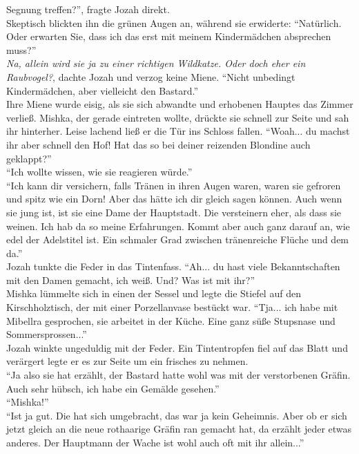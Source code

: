 Segnung treffen?'', fragte Jozah direkt.\\
Skeptisch blickten ihn die grünen Augen an, während sie erwiderte: ``Natürlich. Oder erwarten Sie, 
dass ich das erst mit meinem Kindermädchen absprechen muss?''\\
\textit{Na, allein wird sie ja zu einer richtigen Wildkatze. Oder doch eher ein Raubvogel?}, dachte 
Jozah und verzog keine Miene. ``Nicht unbedingt Kindermädchen, aber vielleicht den Bastard.''\\
Ihre Miene wurde eisig, als sie sich abwandte und erhobenen Hauptes das Zimmer verließ. Mishka, der 
gerade eintreten wollte, drückte sie schnell zur Seite und sah ihr hinterher. Leise lachend ließ er 
die Tür ins Schloss fallen. ``Woah... du machst ihr aber schnell den Hof! Hat das so bei deiner 
reizenden Blondine auch geklappt?''\\
``Ich wollte wissen, wie sie reagieren würde.''\\
``Ich kann dir versichern, falls Tränen in ihren Augen waren, waren sie gefroren und spitz wie ein 
Dorn! Aber das hätte ich dir gleich sagen können. Auch wenn sie jung ist, ist sie eine Dame der 
Hauptstadt. Die versteinern eher, als dass sie weinen. Ich hab da so meine Erfahrungen. Kommt aber 
auch ganz darauf an, wie edel der Adelstitel ist. Ein schmaler Grad zwischen tränenreiche Flüche 
und dem da.''\\
Jozah tunkte die Feder in das Tintenfass. ``Ah... du hast viele Bekanntschaften mit den 
Damen gemacht, ich weiß. Und? Was ist mit ihr?''\\
Mishka lümmelte sich in einen der Sessel und legte die Stiefel auf den Kirschholztisch, der mit 
einer Porzellanvase bestückt war. ``Tja... ich habe mit Mibellra gesprochen, sie arbeitet in der 
Küche. Eine ganz süße Stupsnase und Sommersprossen...''\\
Jozah winkte ungeduldig mit der Feder. Ein Tintentropfen fiel auf das Blatt und verärgert legte er 
es zur Seite um ein frisches zu nehmen.\\
``Ja also sie hat erzählt, der Bastard hatte wohl was mit der verstorbenen Gräfin. Auch sehr 
hübsch, ich habe ein Gemälde gesehen.''\\
``Mishka!''\\
``Ist ja gut. Die hat sich umgebracht, das war ja kein Geheimnis. Aber ob er sich jetzt gleich an 
die neue rothaarige Gräfin ran gemacht hat, da erzählt jeder etwas anderes. Der Hauptmann der Wache 
ist wohl auch oft mit ihr allein...''\\
